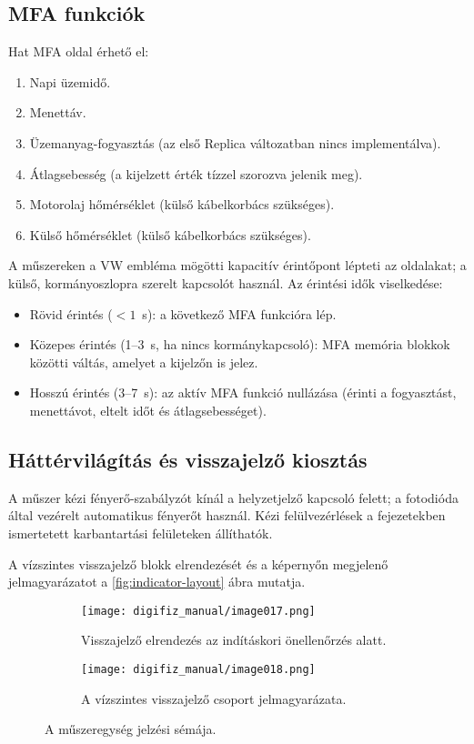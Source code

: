 \subsection{MFA funkciók}
Hat MFA oldal érhető el:
\begin{enumerate}
    \item Napi üzemidő.
    \item Menettáv.
    \item Üzemanyag-fogyasztás (az első Replica változatban nincs implementálva).
    \item Átlagsebesség (a kijelzett érték tízzel szorozva jelenik meg).
    \item Motorolaj hőmérséklet (külső kábelkorbács szükséges).
    \item Külső hőmérséklet (külső kábelkorbács szükséges).
\end{enumerate}
A \ReplicaGenOneShort{} műszereken a VW embléma mögötti kapacitív érintőpont lépteti az oldalakat; a \ReplicaNextShort{} külső, kormányoszlopra szerelt kapcsolót használ. Az érintési idők viselkedése:
\begin{itemize}
    \item Rövid érintés (\(<1\)~s): a következő MFA funkcióra lép.
    \item Közepes érintés (1--3~s, ha nincs kormánykapcsoló): MFA memória blokkok közötti váltás, amelyet a kijelzőn is jelez.
    \item Hosszú érintés (3--7~s): az aktív MFA funkció nullázása (érinti a fogyasztást, menettávot, eltelt időt és átlagsebességet).
\end{itemize}

\subsection{Háttérvilágítás és visszajelző kiosztás}
A \ReplicaGenOneShort{} műszer kézi fényerő-szabályzót kínál a helyzetjelző kapcsoló felett; a \ReplicaNextShort{} fotodióda által vezérelt automatikus fényerőt használ. Kézi felülvezérlések a  fejezetekben ismertetett karbantartási felületeken állíthatók.

A vízszintes visszajelző blokk elrendezését és a képernyőn megjelenő jelmagyarázatot a \autoref{fig:indicator-layout} ábra mutatja.

\begin{figure}[htbp]
    \centering
    \begin{subfigure}{0.48\textwidth}
        \texttt{[image: digifiz\_manual/image017.png]}
        \caption{Visszajelző elrendezés az indításkori önellenőrzés alatt.}
    \end{subfigure}\hfill
    \begin{subfigure}{0.48\textwidth}
        \texttt{[image: digifiz\_manual/image018.png]}
        \caption{A vízszintes visszajelző csoport jelmagyarázata.}
    \end{subfigure}
    \caption{A műszeregység jelzési sémája.}
    \label{fig:indicator-layout}
\end{figure}

